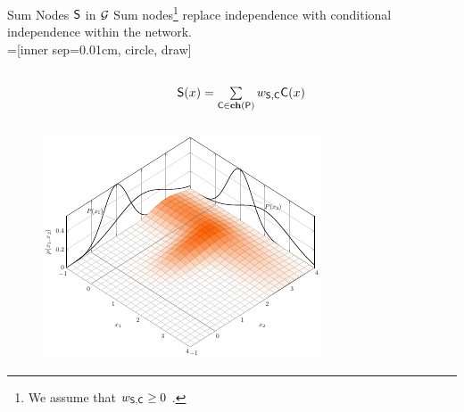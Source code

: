 \begin{frame}{Sum Nodes $\mathsf{S}$ in $\mathcal{G}$}
Sum nodes\footnote{\scriptsize We assume that $w_{\mathsf{S}, \mathsf{C}} \geq 0$ .} replace independence with conditional independence within the network.\\[1em]

=[inner sep=0.01cm, circle, draw]
\begin{columns}
\begin{column}{.2\linewidth}
\end{column}
\begin{column}{.2\linewidth}
\end{column}
\begin{column}{.4\linewidth}
$\mathsf{S}(x)  = \sum\limits_{\mathsf{C} \in \mathbf{ch}(\mathsf{P})}  w_{\mathsf{S}, \mathsf{C}}\mathsf{C}(x)$
\end{column}
\begin{column}{.2\linewidth}
\end{column}
\end{columns}

\centering
\begin{figure}
\includegraphics{sum_distribution}
\end{figure}
\end{frame}

